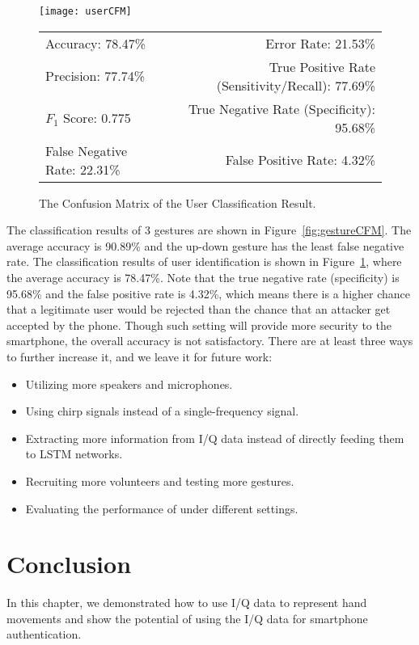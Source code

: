 \begin{figure}[!h]
	\centering
	\begin{minipage}{.45\linewidth}
		\texttt{[image: userCFM]}
		\vspace{.05in}
	\end{minipage}
	
	\centering
	\begin{tabular}{lr}
		\toprule
		Accuracy: 78.47\% & \hspace{-.55in} Error Rate: 21.53\% \\
		Precision: 77.74\% & \hspace{-.55in} True Positive Rate (Sensitivity/Recall): 77.69\% \\
		$F_1$ Score: 0.775 & \hspace{-.55in} True Negative Rate (Specificity): 95.68\% \\
		False Negative Rate: 22.31\%  & \hspace{-.55in} False Positive Rate: 4.32\% \\
		\bottomrule
	\end{tabular}
	\caption{The Confusion Matrix of the User Classification Result.
	}
	\label{fig:userCFM}
\end{figure}

The classification results of 3 gestures are shown in Figure~\ref{fig:gestureCFM}. The average accuracy is 90.89\% and the up-down gesture has the least false negative rate. The classification results of user identification is shown in Figure~\ref{fig:userCFM}, where the average accuracy is 78.47\%.  Note that the true negative rate (specificity) is 95.68\% and the false positive rate is 4.32\%, which means there is a higher chance that a legitimate user would be rejected than the chance that an attacker get accepted by the phone. Though such setting will provide more security to the smartphone, the overall accuracy is not satisfactory. There are at least three ways to further increase it, and we leave it for future work:
\begin{itemize}
	\item Utilizing more speakers and microphones. 
	\item Using chirp signals instead of a single-frequency signal.
	\item Extracting more information from I/Q data instead of directly feeding them to LSTM networks.
	\item Recruiting more volunteers and testing more gestures.
	\item Evaluating the performance of {\uu} under different settings. 
\end{itemize}







\section{Conclusion}
In this chapter, we demonstrated how to use I/Q data to represent hand movements and show the potential of using the I/Q data for smartphone authentication. 
